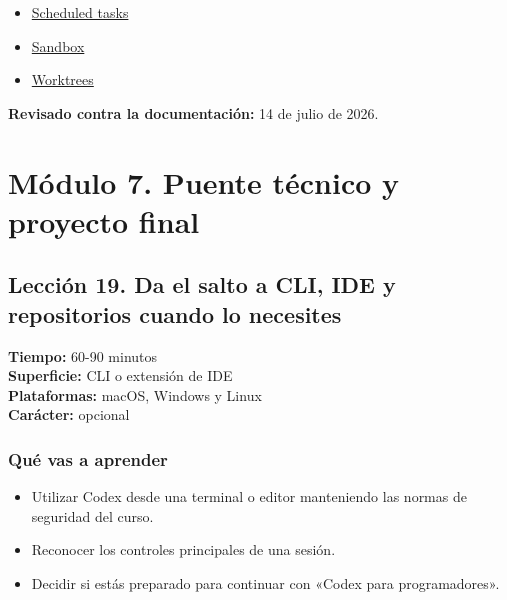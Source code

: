 \documentclass[10pt,a4paper,openany]{book}
\providecommand{\tightlist}{\setlength{\itemsep}{0.18em}\setlength{\parskip}{0pt}}
\begin{document}
\begin{itemize}
\tightlist
\item
  \href{https://learn.chatgpt.com/docs/automations}{Scheduled tasks}
\item
  \href{https://learn.chatgpt.com/docs/sandboxing}{Sandbox}
\item
  \href{https://learn.chatgpt.com/docs/environments/git-worktrees}{Worktrees}
\end{itemize}

\textbf{Revisado contra la documentación:} 14 de julio de 2026.

\chapter{Módulo 7. Puente técnico y proyecto
final}\label{muxf3dulo-7.-puente-tuxe9cnico-y-proyecto-final}

\clearpage

\section{Lección 19. Da el salto a CLI, IDE y repositorios cuando lo
necesites}\label{lecciuxf3n-19.-da-el-salto-a-cli-ide-y-repositorios-cuando-lo-necesites}

\begin{metabox}

\textbf{Tiempo:} 60-90 minutos\\
\textbf{Superficie:} CLI o extensión de IDE\\
\textbf{Plataformas:} macOS, Windows y Linux\\
\textbf{Carácter:} opcional

\end{metabox}

\subsection{Qué vas a aprender}\label{quuxe9-vas-a-aprender-18}

\begin{itemize}
\tightlist
\item
  Utilizar Codex desde una terminal o editor manteniendo las normas de
  seguridad del curso.
\item
  Reconocer los controles principales de una sesión.
\item
  Decidir si estás preparado para continuar con «Codex para
  programadores».
\end{itemize}
\end{document}
